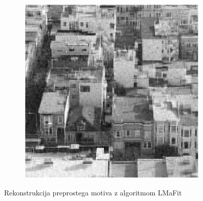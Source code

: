 \begin{figure}
\begin{subfigure}{0.325\linewidth}
    \end{subfigure}
    \hfill
    \begin{subfigure}{0.325\linewidth}
        \includegraphics[width=\linewidth]{Poglavja/Slike/kompleksnost/kompleksna grayscale 300/rez60LMaFit.png}
    \end{subfigure}
    \caption{Rekonstrukcija preprostega motiva z algoritmom LMaFit}
\end{figure}